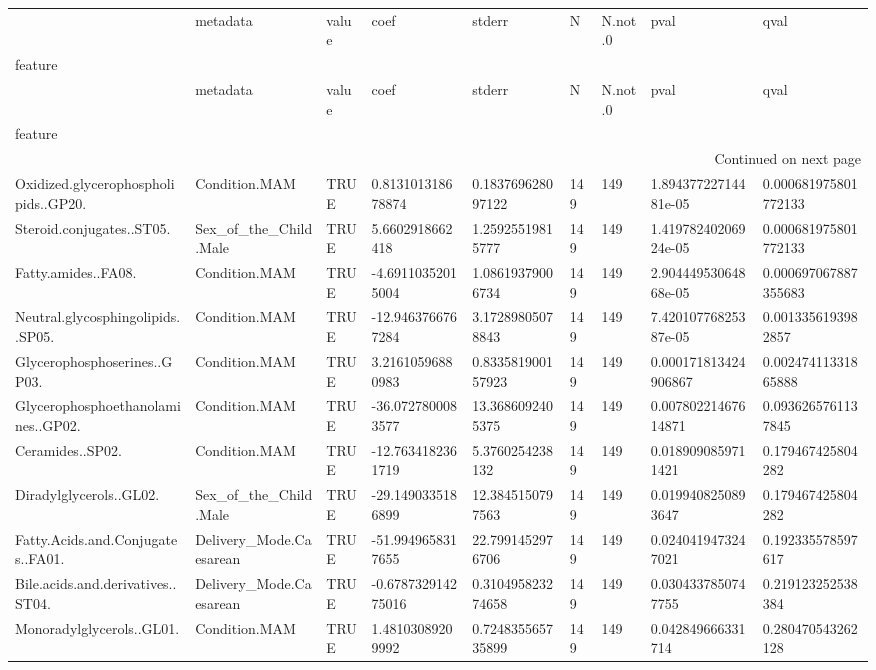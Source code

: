 \begin{longtable}{lllllllll}
\toprule
 & metadata & value & coef & stderr & N & N.not.0 & pval & qval \\
feature &  &  &  &  &  &  &  &  \\
\midrule
\endfirsthead
\toprule
 & metadata & value & coef & stderr & N & N.not.0 & pval & qval \\
feature &  &  &  &  &  &  &  &  \\
\midrule
\endhead
\midrule
\multicolumn{9}{r}{Continued on next page} \\
\midrule
\endfoot
\bottomrule
\endlastfoot
Oxidized.glycerophospholipids..GP20. & Condition.MAM & TRUE & 0.813101318678874 & 0.183769628097122 & 149 & 149 & 1.89437722714481e-05 & 0.000681975801772133 \\
Steroid.conjugates..ST05. & Sex\_of\_the\_Child.Male & TRUE & 5.6602918662418 & 1.25925519815777 & 149 & 149 & 1.41978240206924e-05 & 0.000681975801772133 \\
Fatty.amides..FA08. & Condition.MAM & TRUE & -4.69110352015004 & 1.08619379006734 & 149 & 149 & 2.90444953064868e-05 & 0.000697067887355683 \\
Neutral.glycosphingolipids..SP05. & Condition.MAM & TRUE & -12.9463766767284 & 3.17289805078843 & 149 & 149 & 7.42010776825387e-05 & 0.0013356193982857 \\
Glycerophosphoserines..GP03. & Condition.MAM & TRUE & 3.21610596880983 & 0.833581900157923 & 149 & 149 & 0.000171813424906867 & 0.00247411331865888 \\
Glycerophosphoethanolamines..GP02. & Condition.MAM & TRUE & -36.0727800083577 & 13.3686092405375 & 149 & 149 & 0.00780221467614871 & 0.0936265761137845 \\
Ceramides..SP02. & Condition.MAM & TRUE & -12.7634182361719 & 5.3760254238132 & 149 & 149 & 0.0189090859711421 & 0.179467425804282 \\
Diradylglycerols..GL02. & Sex\_of\_the\_Child.Male & TRUE & -29.1490335186899 & 12.3845150797563 & 149 & 149 & 0.0199408250893647 & 0.179467425804282 \\
Fatty.Acids.and.Conjugates..FA01. & Delivery\_Mode.Caesarean & TRUE & -51.9949658317655 & 22.7991452976706 & 149 & 149 & 0.0240419473247021 & 0.192335578597617 \\
Bile.acids.and.derivatives..ST04. & Delivery\_Mode.Caesarean & TRUE & -0.678732914275016 & 0.310495823274658 & 149 & 149 & 0.0304337850747755 & 0.219123252538384 \\
Monoradylglycerols..GL01. & Condition.MAM & TRUE & 1.48103089209992 & 0.724835565735899 & 149 & 149 & 0.042849666331714 & 0.280470543262128 \\

\end{longtable}
